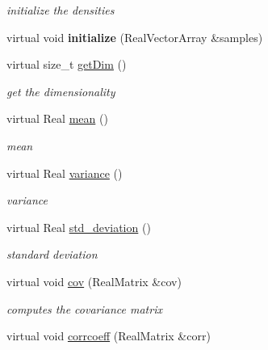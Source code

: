 \begin{DoxyCompactItemize}
\begin{DoxyCompactList}\small\item\em initialize the densities \end{DoxyCompactList}\item 
virtual void {\bfseries initialize} (Real\+Vector\+Array \&samples)\label{classPecos_1_1DensityEstimator_a50fd0e9c6addf748bf7ae040ec0d91f9}

\item 
virtual size\+\_\+t \hyperlink{classPecos_1_1DensityEstimator_a890ccac161f0becd266252b4cd3b9584}{get\+Dim} ()\label{classPecos_1_1DensityEstimator_a890ccac161f0becd266252b4cd3b9584}

\begin{DoxyCompactList}\small\item\em get the dimensionality \end{DoxyCompactList}\item 
virtual Real \hyperlink{classPecos_1_1DensityEstimator_adc6f262952d05a33ff68cae37929cbb2}{mean} ()\label{classPecos_1_1DensityEstimator_adc6f262952d05a33ff68cae37929cbb2}

\begin{DoxyCompactList}\small\item\em mean \end{DoxyCompactList}\item 
virtual Real \hyperlink{classPecos_1_1DensityEstimator_a38f6da77468be17e02ce38af2c0976c3}{variance} ()\label{classPecos_1_1DensityEstimator_a38f6da77468be17e02ce38af2c0976c3}

\begin{DoxyCompactList}\small\item\em variance \end{DoxyCompactList}\item 
virtual Real \hyperlink{classPecos_1_1DensityEstimator_a3e3c923ec6be63011f72bb65b08789ed}{std\+\_\+deviation} ()\label{classPecos_1_1DensityEstimator_a3e3c923ec6be63011f72bb65b08789ed}

\begin{DoxyCompactList}\small\item\em standard deviation \end{DoxyCompactList}\item 
virtual void \hyperlink{classPecos_1_1DensityEstimator_a8cf84ab65e0bccb16f5cdbccc9790dc9}{cov} (Real\+Matrix \&cov)\label{classPecos_1_1DensityEstimator_a8cf84ab65e0bccb16f5cdbccc9790dc9}

\begin{DoxyCompactList}\small\item\em computes the covariance matrix \end{DoxyCompactList}\item 
virtual void \hyperlink{classPecos_1_1DensityEstimator_a277fd59fe80b41f6ed6f5ff12e19f921}{corrcoeff} (Real\+Matrix \&corr)\label{classPecos_1_1DensityEstimator_a277fd59fe80b41f6ed6f5ff12e19f921}


\end{DoxyCompactItemize}
